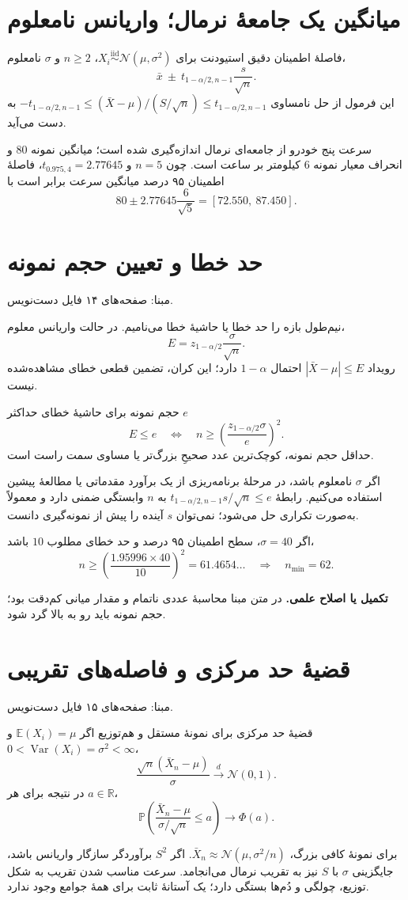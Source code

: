\documentclass[12pt,a4paper,oneside]{report}
\newcounter{ex}[chapter]
\newenvironment{example}[1]{\refstepcounter{ex}\begin{tcolorbox}[breakable=false,title={مثال \thechapter.\arabic{ex} | #1},colframe=muted,colback=white]}{\end{tcolorbox}}
\newcommand{\edit}[1]{\par\begingroup\small\color{alert}\textbf{تکمیل یا اصلاح علمی.} #1\par\endgroup}
\newcommand{\source}[1]{\par{\small\color{muted} مبنا: صفحه‌های #1 فایل دست‌نویس.}\par}
\newcommand{\E}{\mathbb E}
\newcommand{\Var}{\operatorname{Var}}
\newcommand{\iid}{\overset{\mathrm{iid}}{\sim}}
\newcommand{\N}{\mathcal N}
\newcommand{\R}{\mathbb R}
\newcommand{\Prob}{\mathbb P}
\begin{document}
\section{میانگین یک جامعهٔ نرمال؛ واریانس نامعلوم}
\begin{result}{فاصلهٔ اطمینان دقیق استیودنت}
برای $X_i\iid\N(\mu,\sigma^2)$، $n\ge2$ و $\sigma$ نامعلوم،
\[
\boxed{\bar x\ \pm\ t_{1-\alpha/2,n-1}\frac{s}{\sqrt n}.}
\]
این فرمول از حل نامساوی $-t_{1-\alpha/2,n-1}\le(\bar X-\mu)/(S/\sqrt n)\le t_{1-\alpha/2,n-1}$ به دست می‌آید.
\end{result}
\begin{example}{سرعت پنج خودرو}
سرعت پنج خودرو از جامعه‌ای نرمال اندازه‌گیری شده است؛ میانگین نمونه $80$ و انحراف معیار نمونه $6$ کیلومتر بر ساعت است. چون $n=5$ و $t_{0.975,4}=2.77645$، فاصلهٔ اطمینان ۹۵ درصد میانگین سرعت برابر است با
\[
80\pm2.77645\frac6{\sqrt5}
=\boxed{[72.550,\ 87.450]}.
\]
\end{example}
\section{حد خطا و تعیین حجم نمونه}
\source{۱۴}
نیم‌طول بازه را حد خطا یا حاشیهٔ خطا می‌نامیم. در حالت واریانس معلوم،
\[E=z_{1-\alpha/2}\frac\sigma{\sqrt n}.\]
رویداد $|\bar X-\mu|\le E$ احتمال $1-\alpha$ دارد؛ این کران، تضمین قطعی خطای مشاهده‌شده نیست.
\begin{result}{حجم نمونه برای حاشیهٔ خطای حداکثر $e$}
\[
E\le e\quad\Longleftrightarrow\quad
n\ge\left(\frac{z_{1-\alpha/2}\sigma}{e}\right)^2.
\]
حداقل حجم نمونه، کوچک‌ترین عدد صحیحِ بزرگ‌تر یا مساوی سمت راست است.
\end{result}
اگر $\sigma$ نامعلوم باشد، در مرحلهٔ برنامه‌ریزی از یک برآورد مقدماتی یا مطالعهٔ پیشین استفاده می‌کنیم. رابطهٔ $t_{1-\alpha/2,n-1}s/\sqrt n\le e$ به $n$ وابستگی ضمنی دارد و معمولاً به‌صورت تکراری حل می‌شود؛ نمی‌توان $s$ آینده را پیش از نمونه‌گیری دانست.
\begin{example}{حجم نمونه با انحراف معیار ۴۰}
اگر $\sigma=40$، سطح اطمینان ۹۵ درصد و حد خطای مطلوب $10$ باشد،
\[
n\ge\left(\frac{1.95996\times40}{10}\right)^2=61.4654\ldots
\quad\Longrightarrow\quad\boxed{n_{\min}=62}.
\]
\edit{در متن مبنا محاسبهٔ عددی ناتمام و مقدار میانی کم‌دقت بود؛ حجم نمونه باید رو به بالا گرد شود.}
\end{example}
\section{قضیهٔ حد مرکزی و فاصله‌های تقریبی}
\source{۱۵}
\begin{result}{قضیهٔ حد مرکزی برای نمونهٔ مستقل و هم‌توزیع}
اگر $\E(X_i)=\mu$ و $0<\Var(X_i)=\sigma^2<\infty$،
\[
\frac{\sqrt n(\bar X_n-\mu)}\sigma\xrightarrow{d}\N(0,1).
\]
در نتیجه برای هر $a\in\R$،
\[
\Prob\left(\frac{\bar X_n-\mu}{\sigma/\sqrt n}\le a\right)\to\Phi(a).
\]
\end{result}
برای نمونهٔ کافی بزرگ، $\bar X_n\approx\N(\mu,\sigma^2/n)$. اگر $S^2$ برآوردگر سازگار واریانس باشد، جایگزینی $\sigma$ با $S$ نیز به تقریب نرمال می‌انجامد. سرعت مناسب شدن تقریب به شکل توزیع، چولگی و دُم‌ها بستگی دارد؛ یک آستانهٔ ثابت برای همهٔ جوامع وجود ندارد.
\end{document}
